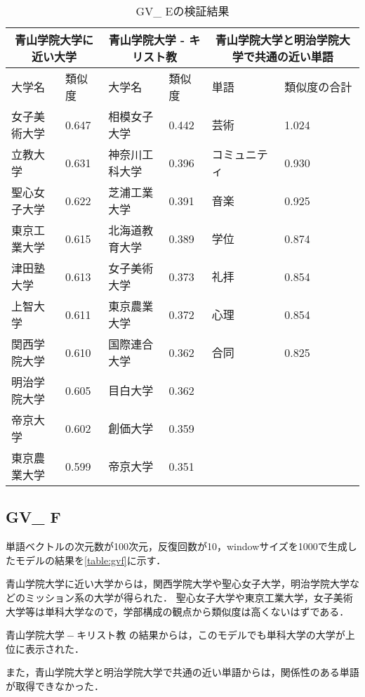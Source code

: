 \begin{table}[H]
\caption{GV\_ Eの検証結果}
\centering
\footnotesize
\begin{tabular}{ll|ll|ll}
\hline
\multicolumn{2}{c}{青山学院大学に近い大学} & \multicolumn{2}{c}{青山学院大学 - キリスト教} & \multicolumn{2}{c}{青山学院大学と明治学院大学で共通の近い単語}
\\ \hline
大学名 & 類似度 & 大学名 & 類似度 & 単語 & 類似度の合計
\\ \hline \hline
女子美術大学 & 0.647 & 相模女子大学 & 0.442 & 芸術 & 1.024\\
立教大学 & 0.631 & 神奈川工科大学 & 0.396 & コミュニティ & 0.930\\
聖心女子大学 & 0.622 & 芝浦工業大学 & 0.391 & 音楽 & 0.925\\
東京工業大学 & 0.615 & 北海道教育大学 & 0.389 & 学位 & 0.874\\
津田塾大学 & 0.613 & 女子美術大学 & 0.373 & 礼拝 & 0.854\\
上智大学 & 0.611 & 東京農業大学 & 0.372 & 心理 & 0.854\\
関西学院大学 & 0.610 & 国際連合大学 & 0.362 & 合同 & 0.825\\
明治学院大学 & 0.605 & 目白大学 & 0.362 & & \\
帝京大学 & 0.602 & 創価大学 & 0.359 & & \\
東京農業大学 & 0.599 & 帝京大学 & 0.351 & & \\ \hline
\end{tabular}
\label{table:gve}
\end{table}

\subsection{GV\_ F}
単語ベクトルの次元数が100次元，反復回数が10，windowサイズを1000で生成したモデルの結果を\ref{table:gvf}に示す．

青山学院大学に近い大学からは，関西学院大学や聖心女子大学，明治学院大学などのミッション系の大学が得られた．
聖心女子大学や東京工業大学，女子美術大学等は単科大学なので，学部構成の観点から類似度は高くないはずである．

$ 青山学院大学 - キリスト教 $ の結果からは，このモデルでも単科大学の大学が上位に表示された．

また，青山学院大学と明治学院大学で共通の近い単語からは，関係性のある単語が取得できなかった．

